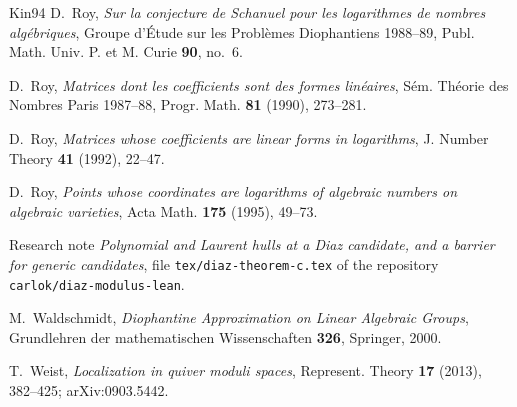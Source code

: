 \documentclass[11pt,a4paper]{article}
\theoremstyle{plain}
\theoremstyle{definition}
\begin{document}
\begin{thebibliography}{Kin94}
D.~Roy, \emph{Sur la conjecture de Schanuel pour les logarithmes de nombres alg\'ebriques}, Groupe d'\'Etude sur les Probl\`emes Diophantiens 1988--89, Publ. Math. Univ. P. et M. Curie \textbf{90}, no.~6.

D.~Roy, \emph{Matrices dont les coefficients sont des formes lin\'eaires}, S\'em. Th\'eorie des Nombres Paris 1987--88, Progr. Math. \textbf{81} (1990), 273--281.

D.~Roy, \emph{Matrices whose coefficients are linear forms in logarithms}, J. Number Theory \textbf{41} (1992), 22--47.

D.~Roy, \emph{Points whose coordinates are logarithms of algebraic numbers on algebraic varieties}, Acta Math. \textbf{175} (1995), 49--73.

Research note \emph{Polynomial and Laurent hulls at a Diaz candidate, and a barrier for generic candidates}, file \texttt{tex/diaz-theorem-c.tex} of the repository \texttt{carlok/diaz-modulus-lean}.

M.~Waldschmidt, \emph{Diophantine Approximation on Linear Algebraic Groups}, Grundlehren der mathematischen Wissenschaften \textbf{326}, Springer, 2000.

T.~Weist, \emph{Localization in quiver moduli spaces}, Represent. Theory \textbf{17} (2013), 382--425; arXiv:0903.5442.

\end{thebibliography}
\end{document}
